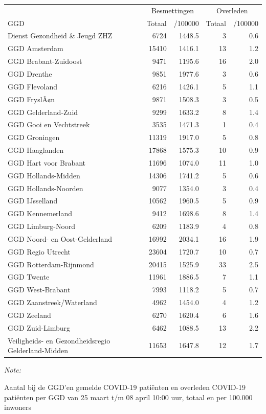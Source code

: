 \documentclass[
  english,
  man,floatsintext]{apa6}
\begin{document}
\begin{table}
\centering\begingroup\fontsize{10}{12}\selectfont

\begin{threeparttable}
\begin{tabular}{lrrrr}
\toprule
\multicolumn{1}{c}{ } & \multicolumn{2}{c}{Besmettingen} & \multicolumn{2}{c}{Overleden} \\
\cmidrule(l{3pt}r{3pt}){2-3} \cmidrule(l{3pt}r{3pt}){4-5}
GGD & Totaal & /100000 & Totaal & /100000\\
\midrule
Dienst Gezondheid \& Jeugd ZHZ & 6724 & 1448.5 & 3 & 0.6\\
GGD Amsterdam & 15410 & 1416.1 & 13 & 1.2\\
GGD Brabant-Zuidoost & 9471 & 1195.6 & 16 & 2.0\\
GGD Drenthe & 9851 & 1977.6 & 3 & 0.6\\
GGD Flevoland & 6216 & 1426.1 & 5 & 1.1\\
GGD FryslÃ¢n & 9871 & 1508.3 & 3 & 0.5\\
GGD Gelderland-Zuid & 9299 & 1633.2 & 8 & 1.4\\
GGD Gooi en Vechtstreek & 3535 & 1471.3 & 1 & 0.4\\
GGD Groningen & 11319 & 1917.0 & 5 & 0.8\\
GGD Haaglanden & 17868 & 1575.3 & 10 & 0.9\\
GGD Hart voor Brabant & 11696 & 1074.0 & 11 & 1.0\\
GGD Hollands-Midden & 14306 & 1741.2 & 5 & 0.6\\
GGD Hollands-Noorden & 9077 & 1354.0 & 3 & 0.4\\
GGD IJsselland & 10562 & 1960.5 & 5 & 0.9\\
GGD Kennemerland & 9412 & 1698.6 & 8 & 1.4\\
GGD Limburg-Noord & 6209 & 1183.9 & 4 & 0.8\\
GGD Noord- en Oost-Gelderland & 16992 & 2034.1 & 16 & 1.9\\
GGD Regio Utrecht & 23604 & 1720.7 & 10 & 0.7\\
GGD Rotterdam-Rijnmond & 20415 & 1525.9 & 33 & 2.5\\
GGD Twente & 11961 & 1886.5 & 7 & 1.1\\
GGD West-Brabant & 7993 & 1118.2 & 5 & 0.7\\
GGD Zaanstreek/Waterland & 4962 & 1454.0 & 4 & 1.2\\
GGD Zeeland & 6270 & 1620.4 & 6 & 1.6\\
GGD Zuid-Limburg & 6462 & 1088.5 & 13 & 2.2\\
Veiligheids- en Gezondheidsregio Gelderland-Midden & 11653 & 1647.8 & 12 & 1.7\\
\bottomrule
\end{tabular}
\begin{tablenotes}
\item \textit{Note: } 
\item Aantal bij de GGD’en gemelde COVID-19 patiënten en overleden COVID-19 patiënten per GGD van 25 maart t/m 08 april 10:00 uur, totaal en per 100.000 inwoners
\end{tablenotes}
\end{threeparttable}
\endgroup{}
\end{table}
\end{document}
